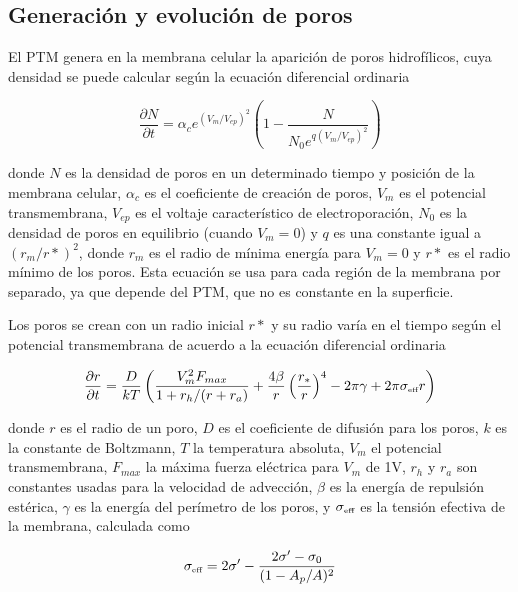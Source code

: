 \subsection*{Generación y evolución de poros}
El PTM genera en la membrana celular la aparición de poros hidrofílicos, cuya densidad se puede calcular según la ecuación diferencial ordinaria \cite{krass-viejo}

\begin{equation} \label{eq:poros-crea}
	\frac{\partial N}{\partial t} = \alpha_c e^{(V_m/V_{ep})^2} \left( 1 - \frac{N}{N_0 e^{q \left(V_m/V_{ep} \right) ^2}} \right)
\end{equation}

donde $N$ es la densidad de poros en un determinado tiempo y posición de la membrana celular, $\alpha_c$ es el coeficiente de creación de poros, $V_m$ es el potencial transmembrana, $V_{ep}$ es el voltaje característico de electroporación, $N_0$ es la densidad de poros en equilibrio (cuando $V_m = 0$) y $q$ es una constante igual a $(r_m / r*)^2$, donde $r_m$ es el radio de mínima energía para $V_m = 0$ y $r*$ es el radio mínimo de los poros. Esta ecuación se usa para cada región de la membrana por separado, ya que depende del PTM, que no es constante en la superficie. 

Los poros se crean con un radio inicial $r*$ y su radio varía en el tiempo según el potencial transmembrana de acuerdo a la ecuación diferencial ordinaria \cite{krass07}

\begin{equation} \label{eq:poros-radio}
	\frac{\partial r}{\partial t} = \frac{D}{kT} \left( \frac{V_m^2 F_{max}}{1+r_h / (r+r_a)} + \frac{4 \beta}{r} \left(\frac{r_*}{r}\right)^4 - 2 \pi \gamma + 2 \pi \sigma_{\textrm{\tiny eff}} r\right)
\end{equation}

donde $r$ es el radio de un poro, $D$ es el coeficiente de difusión para los poros, $k$ es la constante de Boltzmann, $T$ la temperatura absoluta, $V_m$ el potencial transmembrana, $F_{max}$ la máxima fuerza eléctrica para $V_m$ de 1V, $r_h$ y $r_a$ son constantes usadas para la velocidad de advección, $\beta$ es la energía de repulsión estérica, $\gamma$ es la energía del perímetro de los poros, y $\sigma_{\textrm{\tiny eff}}$ es la tensión efectiva de la membrana, calculada como

\begin{equation}
	\sigma_{\textrm{\tiny eff}} = 2 \sigma^\prime - \frac{2 \sigma^\prime - \sigma_0}{(1 - A_p / A)^2}
\end{equation}

